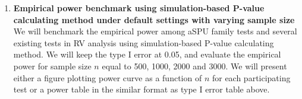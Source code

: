 \documentclass[12pt]{article}
\begin{document}
\begin{enumerate}


\item \textbf{Empirical power benchmark using simulation-based P-value calculating method under default settings with varying sample size}\\
We will benchmark the empirical power among aSPU family tests and several existing tests in RV analysis using simulation-based P-value calculating method. We will keep the type I error at 0.05, and evaluate the empirical power for sample size $n$ equal to 500, 1000, 2000 and 3000. We will present either a figure plotting power curve as a function of $n$ for each participating test or a power table in the similar format as type I error table above.



\end{enumerate}
\end{document}
